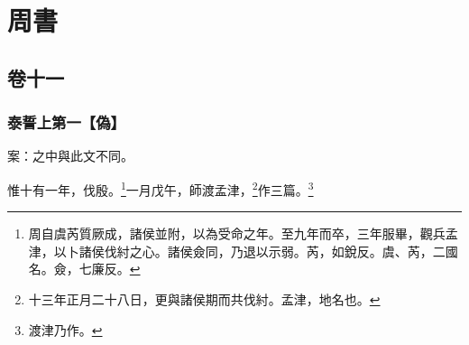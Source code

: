 


\part{周書}


\chapter{卷十一}


\section{泰誓上第一【偽】}

 {\noindent\zhuan{}\fzbyks 案：之中與此文不同。 \par}

惟十有一年，伐殷。\footnote{周自虞芮質厥成，諸侯並附，以為受命之年。至九年而卒，三年服畢，觀兵孟津，以卜諸侯伐紂之心。諸侯僉同，乃退以示弱。芮，如銳反。虞、芮，二國名。僉，七廉反。}一月戊午，師渡孟津，\footnote{十三年正月二十八日，更與諸侯期而共伐紂。孟津，地名也。}作三篇。\footnote{渡津乃作。}


